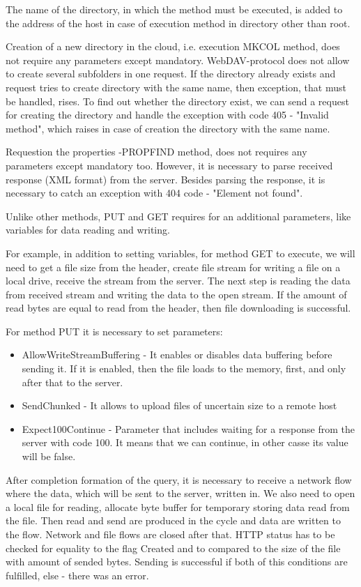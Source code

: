 \documentclass[12pt,journal,compsoc]{D:/Магистратура/English/bare_conf/IEEEtran}
\begin{document}
The name of the directory, in which the method must be executed, is added to the address of the host in case of execution method in directory other than root.

Creation of a new directory in the cloud, i.e. execution MKCOL method, does not require any parameters except mandatory. WebDAV-protocol does not allow to create several subfolders in one request. If the directory already exists and request tries to create directory with the same name, then exception, that must be handled, rises. To find out whether the directory exist, we can send a request for creating the directory and handle the exception with code 405 - "Invalid method", which raises in case of creation the directory with the same name.

Requestion the properties -PROPFIND method, does not requires any parameters except mandatory too. However, it is necessary to parse received response (XML format) from the server. Besides parsing the response, it is necessary to catch an exception with 404 code - "Element not found".

Unlike other methods, PUT and GET requires for an additional parameters, like variables for data reading and writing.

For example, in addition to setting variables, for method GET to execute, we will need to get a file size from the header, create file stream for writing a file on a local drive, receive the stream from the server. The next step is reading the data from received stream and writing the data to the open stream. If the amount of read bytes are equal to read from the header, then file downloading is successful.

For method PUT it is necessary to set parameters:
 \begin{itemize}
\item AllowWriteStreamBuffering - It enables or disables data buffering before sending it. If it is enabled, then the file loads to the memory, first, and only after that to the server.
\item SendChunked - It allows to upload files of uncertain size to a remote host 
\item Expect100Continue - Parameter that includes waiting for a response from the server with code 100. It means that we can continue, in other casse its value will be false.
\end{itemize}

After completion formation of the query, it is necessary to receive a network flow where the data, which will be sent to the server, written in. We also need to open a local file for reading, allocate byte buffer for temporary storing data read from the file. Then read and send are produced in the cycle and data are written to the flow. Network and file flows are closed after that. HTTP status has to be checked for equality to the flag Created and to compared to the size of the file with amount of sended bytes. Sending is successful if both of this conditions are fulfilled, else - there was an error.
\end{document}
